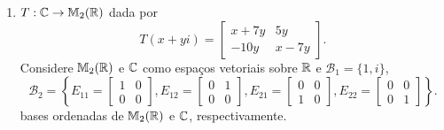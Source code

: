 \documentclass[12pt]{exam}
\begin{document}
\begin{exercicio}
\begin{enumerate}[label={\alph*})]
        \item $T : \mathbb{C} \to \mathbb{M}_2(\mathbb{R})$ dada por
        \[
        T(x + yi) = \begin{bmatrix}
            x + 7y & 5y\\
            -10y & x - 7y
        \end{bmatrix}.
        \]
        Considere $\mathbb{M}_2(\mathbb{R})$ e $\mathbb{C}$ como espaços vetoriais sobre $\mathbb{R}$ e $\mathcal{B}_1 = \{1, i\}$,
        \[
        \mathcal{B}_2 = \left\{E_{11} = \begin{bmatrix}
            1 & 0\\0 & 0
        \end{bmatrix}, E_{12} = \begin{bmatrix}
            0 & 1\\0 & 0
        \end{bmatrix}, E_{21} = \begin{bmatrix}
            0 & 0\\1 & 0
        \end{bmatrix}, E_{22} = \begin{bmatrix}
            0 & 0\\0 & 1
        \end{bmatrix}\right\}.
        \]
        bases ordenadas de $\mathbb{M}_2(\mathbb{R})$ e $\mathbb{C}$, respectivamente.


\end{enumerate}
\end{exercicio}
\end{document}

